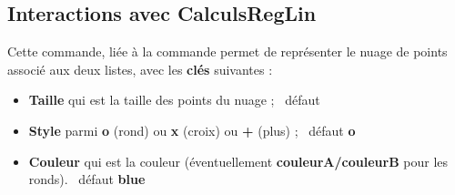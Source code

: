 \documentclass[a4paper,french,11pt]{article}
\newcommand\ctex[1]{\tcbox[vignettelatex]{#1}}
\newcommand\Cle[1]{{\bfseries\sffamily\textlangle #1\textrangle}}
\begin{document}
%

\subsection{Interactions avec CalculsRegLin}

\begin{codetex}
\end{codetex}

\begin{codecles}
Cette commande, liée à la commande \ctex{CalculsRegLin} permet de représenter le nuage de points associé aux deux listes, avec les \Cle{clés} suivantes :

\begin{itemize}
	\item \Cle{Taille} qui est la taille des points du nuage ; \hfill~défaut \Cle{2pt}
	\item \Cle{Style} parmi \Cle{o} (rond) ou \Cle{x} (croix) ou \Cle{+} (plus) ; \hfill~défaut \Cle{o}
	\item \Cle{Couleur} qui est la couleur (éventuellement \Cle{couleurA/couleurB} pour les ronds). \hfill~défaut \Cle{blue}
\end{itemize}
\end{codecles}

\begin{codetex}
\def\LLX{1994,1995,1996,1997,1998,1999,2000,2001,2002,2004,2005,2006,2007,2008,2009,2010}
\def\LLY{1718,1710,1708,1700,1698,1697,1691,1688,1683,1679,1671,1670,1663,1661,1656,1649}

\begin{tikzpicture}[...]
	\NuagePointsTikz[Couleur=blue/red]{\LLX}{\LLY}
\end{tikzpicture}
~~
\begin{tikzpicture}[...]
	\NuagePointsTikz[Couleur=ForestGreen,Style=x,Taille=6pt]{\LLX}{\LLY}
\end{tikzpicture}
\end{codetex}
\end{document}
